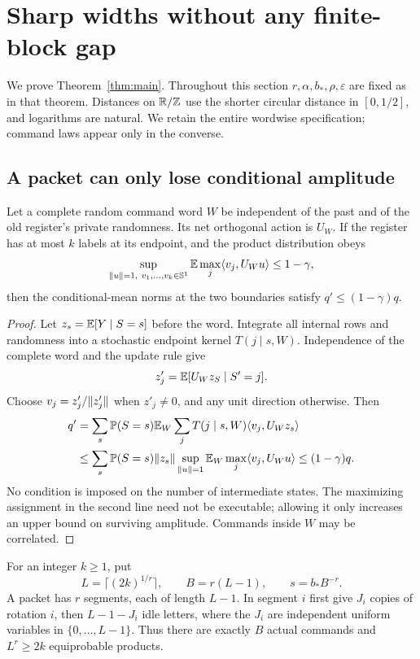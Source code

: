\section{Sharp widths without any finite-block gap}\label{sec:toral}
We prove Theorem~\ref{thm:main}. Throughout this section $r,\alpha,b_*,\rho,\varepsilon$ are fixed as in that theorem. Distances on $\mathbb R/\mathbb Z$ use the shorter circular distance in $[0,1/2]$, and logarithms are natural. We retain the entire wordwise specification; command laws appear only in the converse.

\subsection{A packet can only lose conditional amplitude}
\begin{lemma}\label{lem:packet42}
Let a complete random command word $W$ be independent of the past and of the old register's private randomness. Its net orthogonal action is $U_W$. If the register has at most $k$ labels at its endpoint, and the product distribution obeys
\begin{equation}\label{eq:distortion}
 \sup_{\lVert u\rVert=1,\ v_1,\ldots,v_k\in\mathbb S^1}
       \mathbb E\max_j\langle v_j,U_Wu\rangle\le1-\gamma,
\end{equation}
then the conditional-mean norms at the two boundaries satisfy $q'\le(1-\gamma)q$.
\end{lemma}
\begin{proof}
Let $z_s=\mathbb E[Y\mid S=s]$ before the word. Integrate all internal rows and randomness into a stochastic endpoint kernel $T(j\mid s,W)$. Independence of the complete word and the update rule give
\[
 z'_j=\mathbb E[U_Wz_S\mid S'=j].
\]
Choose $v_j=z'_j/\lVert z'_j\rVert$ when $z'_j\ne0$, and any unit direction otherwise. Then
\begin{align*}
 q'&=\sum_s\mathbb P(S=s)\mathbb E_W\sum_jT(j\mid s,W)\langle v_j,U_Wz_s\rangle\\
 &\le\sum_s\mathbb P(S=s)\lVert z_s\rVert
       \sup_{\lVert u\rVert=1}\mathbb E_W\max_j\langle v_j,U_Wu\rangle
 \le(1-\gamma)q.
\end{align*}
No condition is imposed on the number of intermediate states. The maximizing assignment in the second line need not be executable; allowing it only increases an upper bound on surviving amplitude. Commands inside $W$ may be correlated.
\end{proof}

For an integer $k\ge1$, put
\begin{equation}\label{eq:packet-length}
 L=\lceil(2k)^{1/r}\rceil,\qquad B=r(L-1),\qquad s=b_*B^{-r}.
\end{equation}
A packet has $r$ segments, each of length $L-1$. In segment $i$ first give $J_i$ copies of rotation $i$, then $L-1-J_i$ idle letters, where the $J_i$ are independent uniform variables in $\{0,\ldots,L-1\}$. Thus there are exactly $B$ actual commands and $L^r\ge2k$ equiprobable products.

